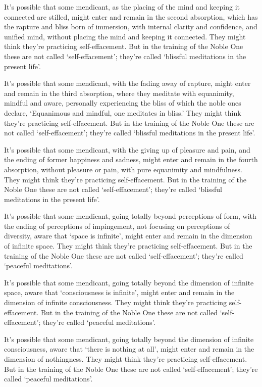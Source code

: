 \documentclass[12pt,openany]{book}%
\begin{document}
It’s possible that some mendicant, as the placing of the mind and keeping it connected are stilled, might enter and remain in the second absorption, which has the rapture and bliss born of immersion, with internal clarity and confidence, and unified mind, without placing the mind and keeping it connected. They might think they’re practicing self-effacement. But in the training of the Noble One these are not called ‘self-effacement’; they’re called ‘blissful meditations in the present life’. 

It’s possible that some mendicant, with the fading away of rapture, might enter and remain in the third absorption, where they meditate with equanimity, mindful and aware, personally experiencing the bliss of which the noble ones declare, ‘Equanimous and mindful, one meditates in bliss.’ They might think they’re practicing self-effacement. But in the training of the Noble One these are not called ‘self-effacement’; they’re called ‘blissful meditations in the present life’. 

It’s possible that some mendicant, with the giving up of pleasure and pain, and the ending of former happiness and sadness, might enter and remain in the fourth absorption, without pleasure or pain, with pure equanimity and mindfulness. They might think they’re practicing self-effacement. But in the training of the Noble One these are not called ‘self-effacement’; they’re called ‘blissful meditations in the present life’. 

It’s possible that some mendicant, going totally beyond perceptions of form, with the ending of perceptions of impingement, not focusing on perceptions of diversity, aware that ‘space is infinite’, might enter and remain in the dimension of infinite space. They might think they’re practicing self-effacement. But in the training of the Noble One these are not called ‘self-effacement’; they’re called ‘peaceful meditations’. 

It’s possible that some mendicant, going totally beyond the dimension of infinite space, aware that ‘consciousness is infinite’, might enter and remain in the dimension of infinite consciousness. They might think they’re practicing self-effacement. But in the training of the Noble One these are not called ‘self-effacement’; they’re called ‘peaceful meditations’. 

It’s possible that some mendicant, going totally beyond the dimension of infinite consciousness, aware that ‘there is nothing at all’, might enter and remain in the dimension of nothingness. They might think they’re practicing self-effacement. But in the training of the Noble One these are not called ‘self-effacement’; they’re called ‘peaceful meditations’. 
\end{document}
